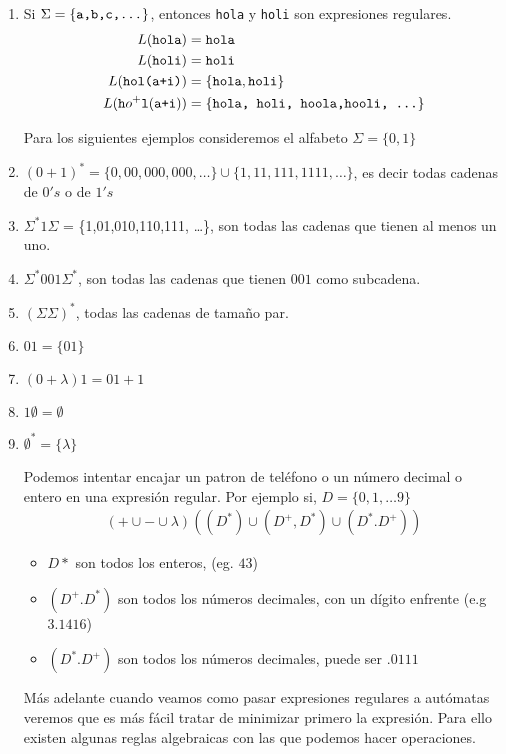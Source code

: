 \begin{enumerate}
    \item Si $\Sigma = \{\texttt{a,b,c,\dots}\}$, entonces \texttt{hola} y \texttt{holi} son expresiones regulares. 
    \begin{align*}
        L(\texttt{hola}) &= \texttt{hola} \\ 
        L(\texttt{holi}) &= \texttt{holi} \\
        L(\texttt{hol(a+i)}) &= \{\texttt{hola}, \texttt{holi}\} \\
        L(\texttt{h}o^+\texttt{l}(\texttt{a+i})) &= \{\texttt{hola, \texttt{holi}, \texttt{hoola},\texttt{hooli}, \dots }\}
    \end{align*}

    Para los siguientes ejemplos consideremos el alfabeto $\Sigma=\{0,1\}$

    \item $(0+1)^* = \{0,00,000,000,\dots\} \cup \{1,11,111,1111, \dots\}$, es decir todas cadenas de $0's$ o de $1's$ 
    \item $\Sigma^*1\Sigma$ = \{1,01,010,110,111, \dots\}, son todas las cadenas que tienen al menos un uno. 
    \item $\Sigma^*001\Sigma^*$, son todas las cadenas que tienen $001$ como subcadena. 
    \item $(\Sigma\Sigma)^*$, todas las cadenas de tamaño par. 
    \item $01 = \{01\}$
    \item $(0 + \lambda)1 = 01 + 1$
    \item $1\emptyset = \emptyset$
    \item $\emptyset^* = \{\lambda\}$

    Podemos intentar encajar un patron de teléfono o un número decimal o entero en una 
    expresión regular. Por ejemplo si, $D=\{0,1, \dots 9\}$
\begin{align*}
    (+ \cup - \cup \lambda)((D^*) \cup (D^+,D^*) \cup (D^*.D^+))
\end{align*}

\begin{itemize}
    \item $D*$ son todos los enteros, (eg. $43$)
    \item $(D^+.D^*)$ son todos los números decimales, con un dígito enfrente (e.g $3.1416$)
    \item $(D^*.D^+)$ son todos los números decimales, puede ser $.0111$ 
\end{itemize}

Más adelante cuando veamos como pasar expresiones regulares a autómatas veremos que es más fácil tratar de minimizar primero la expresión. Para 
ello existen algunas reglas algebraicas con las que podemos hacer operaciones. 


\end{enumerate}